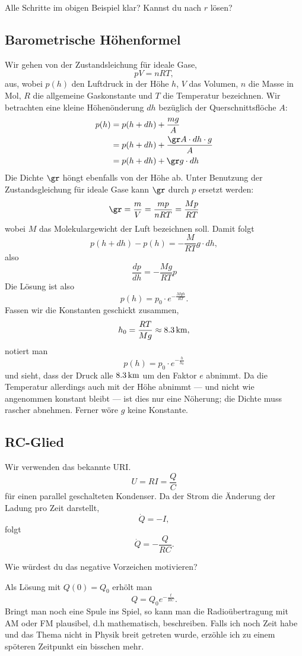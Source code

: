 \documentclass[%
11pt,%
twoside,%
titlepage,%
german,%
headsepline%
]{scrartcl}
\begin{document}
\begin{ueb}
Alle Schritte im obigen Beispiel klar? Kannst du nach $r$ l\"osen?
\end{ueb}

\subsection{Barometrische H\"ohenformel}

Wir
gehen von der Zustandsleichung f\"ur ideale Gase,
$$pV=nRT,$$
aus, wobei $p(h)$ den Luftdruck in der H\"ohe $h$, $V$ das Volumen, $n$ die Masse in Mol, $R$ die allgemeine Gaskonstante und $T$ die Temperatur bezeichnen. Wir betrachten eine kleine H\"ohen\"onderung $dh$ bez\"uglich der Querschnittsfl\"oche $A$:
\begin{align*}
p(h) &= p(h+dh)+\frac{mg}{A}\\
 &=p(h+dh)+\frac{\gr A\cdot dh\cdot g}{A}\\
 &= p(h+dh) + \gr g\cdot dh
 \end{align*}
Die Dichte $\gr$ h\"ongt ebenfalls von der H\"ohe ab. Unter Benutzung der Zustandsgleichung f\"ur ideale Gase kann $\gr$ durch $p$ ersetzt werden:
$$\gr=\frac{m}{V}=\frac{mp}{nRT}=\frac{Mp}{RT}$$
wobei $M$ das Molekulargewicht der Luft bezeichnen soll. Damit folgt
$$p(h+dh)-p(h)=-\frac{M}{RT}g\cdot dh,$$
also
$$\frac{dp}{dh}=-\frac{Mg}{RT}p$$
Die L\"osung ist also
$$p(h)=p_0\cdot e^{-\frac{Mgh}{RT}}.$$
Fassen wir die Konstanten geschickt zusammen,
$$h_0=\frac{RT}{Mg}\approx\unit[8.3]{km},$$
notiert man
$$p(h)=p_0\cdot e^{-\frac{h}{h_0}}$$
und sieht, dass der Druck alle $\unit[8.3]{km}$ um den Faktor $e$ abnimmt. Da die Temperatur allerdings auch mit der H\"ohe abnimmt --- und nicht wie angenommen konstant bleibt --- ist dies nur eine N\"oherung; die Dichte muss rascher abnehmen. Ferner w\"ore $g$ keine Konstante.

\subsection{RC-Glied}

Wir
verwenden das bekannte URI.
$$U=RI=\frac{Q}{C}$$
f\"ur einen parallel geschalteten Kondenser. Da der Strom die \"Anderung der Ladung pro Zeit darstellt,
$$\dot{Q}=-I,$$
folgt
$$\dot{Q}=-\frac{Q}{RC}.$$
\begin{ueb}
Wie w\"urdest du das negative Vorzeichen motivieren?
\end{ueb}
\noindent Als L\"osung mit $Q(0)=Q_0$ erh\"olt man
$$Q=Q_0 e^{-\frac{t}{RC}}.$$
Bringt man noch eine Spule ins Spiel, so kann man die Radio\"ubertragung mit AM oder FM plausibel, d.h mathematisch, beschreiben. Falls ich noch Zeit habe und das Thema nicht in Physik breit getreten wurde, erz\"ohle ich zu einem sp\"oteren Zeitpunkt ein bisschen mehr.
\end{document}
